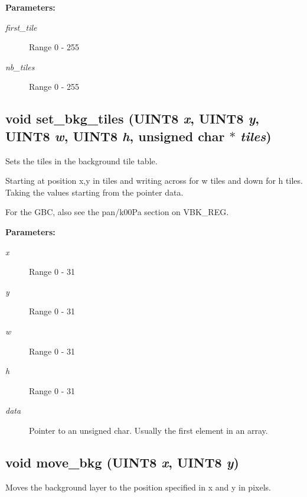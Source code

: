 \begin{Desc}
\item[{\bf Parameters: }]\par
\begin{description}
\item[
{\em first\_\-tile}] Range 0 - 255 \item[
{\em nb\_\-tiles}] Range 0 - 255 \end{description}
\end{Desc}
\label{gb.h_a79}
\subsection{\setlength{\rightskip}{0pt plus 5cm}void set\_\-bkg\_\-tiles ({\bf UINT8} {\em x}, {\bf UINT8} {\em y}, {\bf UINT8} {\em w}, {\bf UINT8} {\em h}, unsigned char $\ast$ {\em tiles})}

Sets the tiles in the background tile table.

Starting at position x,y in tiles and writing across for w tiles and down for h tiles. Taking the values starting from the pointer data.

For the GBC, also see the pan/k00Pa section on VBK\_\-REG.

\begin{Desc}
\item[{\bf Parameters: }]\par
\begin{description}
\item[
{\em x}] Range 0 - 31 \item[
{\em y}] Range 0 - 31 \item[
{\em w}] Range 0 - 31 \item[
{\em h}] Range 0 - 31 \item[
{\em data}] Pointer to an unsigned char. Usually the first element in an array. \end{description}
\end{Desc}
\label{gb.h_a81}
\subsection{\setlength{\rightskip}{0pt plus 5cm}void move\_\-bkg ({\bf UINT8} {\em x}, {\bf UINT8} {\em y})}

Moves the background layer to the position specified in x and y in pixels.

